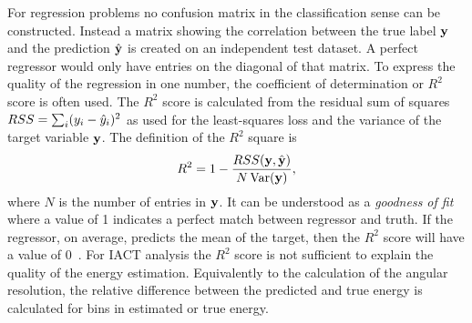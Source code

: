 For regression problems no confusion matrix in the classification sense can be constructed. 
Instead a matrix showing the correlation between the true label $\mathbf{y}$  and the prediction $\hat{\mathbf{{y}}}$ is created on an independent test dataset. 
A perfect regressor would only have entries on the diagonal of that matrix. To express the quality of the regression in one number, the 
coefficient of determination or $R^2$ score is often used. The $R^2$ score is calculated from the residual sum of squares $RSS = \sum_i (y_i - \hat{y}_i)^2$ as used for 
the least-squares loss and the variance of the target variable $\mathbf{y}$.
The definition of the $R^2$ square is 
\begin{equation*}
    R^2 = 1 - \frac{RSS(\mathbf{y}, \hat{\mathbf{{y}}})}{ N \operatorname{Var}(\mathbf{y})},
\end{equation*}
where $N$ is the number of entries in $\mathbf{y}$.
It can be understood as a \emph{goodness of fit} where a value of 1 indicates a perfect match between regressor and truth. If the regressor, on average, predicts 
the mean of the target, then the $R^2$ score will have a value of 0~\cite[486]{stats_devore}. 
For IACT analysis the $R^2$ score is not sufficient to explain the quality of the energy estimation.
Equivalently to the calculation of the angular resolution, the relative difference between the predicted and true energy is calculated
for bins in estimated or true energy.

